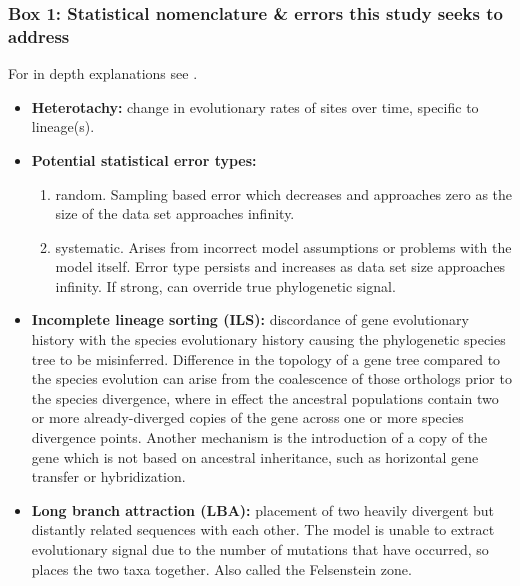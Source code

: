 \documentclass[12pt]{article}
\begin{document}
\subsubsection{Box 1: Statistical nomenclature \& errors this study seeks to address}
\label{sec:statbox}
For in depth explanations see \cite{yang2014molecular}.
\begin{itemize}
  \setlength{\itemsep}{1pt}
  \setlength{\parskip}{0pt}
  \setlength{\parsep}{0pt}
\item \textbf{Heterotachy:} change in evolutionary rates of sites over time, specific to lineage(s).
\item \textbf{Potential statistical error types:}
\begin{enumerate}
  \setlength{\itemsep}{0pt}
  \setlength{\parskip}{0pt}
  \setlength{\parsep}{0pt}
\item random. Sampling based error which decreases and approaches zero as the size of the data set approaches infinity.\\
\item systematic. Arises from incorrect model assumptions or problems with the model itself. 
Error type persists and increases as data set size approaches infinity. 
If strong, can override true phylogenetic signal.
\end{enumerate}
\item \textbf{Incomplete lineage sorting (ILS):} discordance of gene evolutionary history with the species evolutionary history causing the phylogenetic species tree to be misinferred. 
Difference in the topology of a gene tree compared to the species evolution can arise from the coalescence of those orthologs prior to the species divergence, where in effect the ancestral populations contain two or more already-diverged copies of the gene across one or more species divergence points. 
Another mechanism is the introduction of a copy of the gene which is not based on ancestral inheritance, such as horizontal gene transfer or hybridization.
\item \textbf{Long branch attraction (LBA):} placement of two heavily divergent but distantly related sequences with each other. 
The model is unable to extract evolutionary signal due to the number of mutations that have occurred, so places the two taxa together. 
Also called the Felsenstein zone.
\end{itemize}
\end{document}
